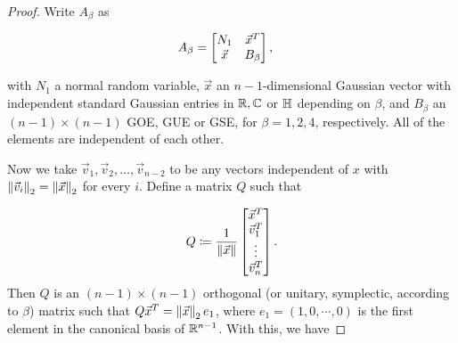 \begin{proof}
    Write $A_{\beta}$ as 

    \begin{align*}
        A_{\beta} &= \begin{bmatrix}
            N_1 & \vec x^T \\ 
            \vec x & B_{\beta}
        \end{bmatrix},
    \end{align*}

    \noindent with $N_1$ a normal random variable, $\vec x$ an $n-1$-dimensional Gaussian vector with independent standard Gaussian entries in $\mathbb R, \mathbb C$ or $\mathbb H$ depending on $\beta$, and $B_{\beta}$ an $(n-1)\times(n-1)$ GOE, GUE or GSE, for $\beta = 1,2,4$, respectively. All of the elements are independent of each other.

    Now we take $\vec v_1, \vec v_2, \dots, \vec v_{n-2}$ to be any vectors independent of $x$ with $\left\lVert\vec v_i\right\rVert_2 = \left\lVert\vec x\right\rVert_2$ for every $i$. Define a matrix $Q$ such that

    \begin{align*}
        Q \coloneqq \frac1{\left\lVert\vec x\right\rVert}\begin{bmatrix}
            \vec x^T \\
            \vec v_1^T \\
            \vdots \\
            \vec v_n^T 
        \end{bmatrix}.
    \end{align*}
    Then $Q$ is an $(n-1)\times(n-1)$ orthogonal (or unitary, symplectic, according to $\beta$) matrix such that $Q \vec x^T = \left\lVert\vec x\right\rVert_2 e_1$, where $e_1 = (1,0,\cdots,0)$ is the first element in the canonical basis of $\mathbb R^{n-1}$. With this,  we have


\end{proof}
